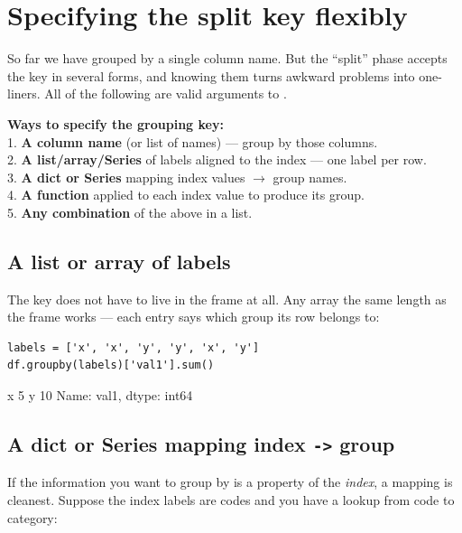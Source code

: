 \documentclass[11pt]{article}
\begin{document}
\section{Specifying the split key flexibly}

So far we have grouped by a single column name. But the ``split'' phase accepts the key in several forms, and knowing them turns awkward problems into one-liners. All of the following are valid arguments to .

\begin{outbox}
\textbf{Ways to specify the grouping key:} \\[3pt]
1. \textbf{A column name} (or list of names) --- group by those columns. \\
2. \textbf{A list/array/Series} of labels aligned to the index --- one label per row. \\
3. \textbf{A dict or Series} mapping index values $\to$ group names. \\
4. \textbf{A function} applied to each index value to produce its group. \\
5. \textbf{Any combination} of the above in a list.
\end{outbox}

\subsection{A list or array of labels}

The key does not have to live in the frame at all. Any array the same length as the frame works --- each entry says which group its row belongs to:

\begin{lstlisting}
labels = ['x', 'x', 'y', 'y', 'x', 'y']
df.groupby(labels)['val1'].sum()
\end{lstlisting}

\begin{outblock}
x    5
y   10
Name: val1, dtype: int64
\end{outblock}

\subsection{A dict or Series mapping index \texttt{->} group}

If the information you want to group by is a property of the \emph{index}, a mapping is cleanest. Suppose the index labels are codes and you have a lookup from code to category:
\end{document}
